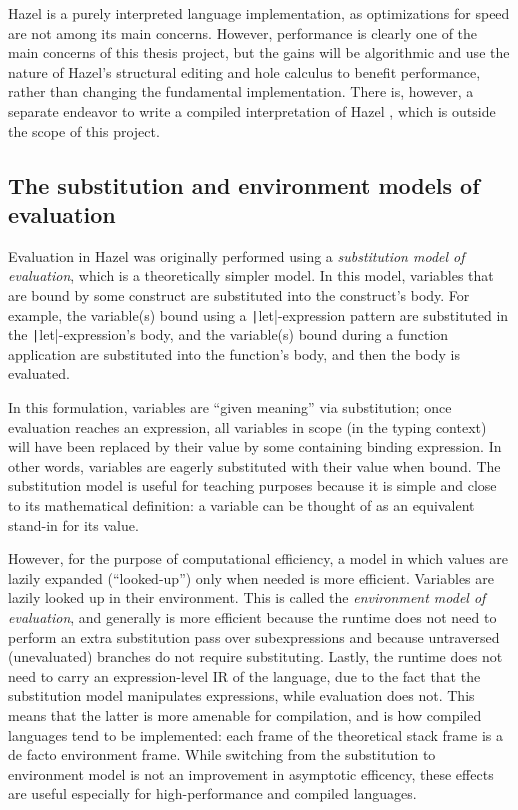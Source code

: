Hazel is a purely interpreted language implementation, as optimizations for speed are not among its main concerns. However, performance is clearly one of the main concerns of this thesis project, but the gains will be algorithmic and use the nature of Hazel's structural editing and hole calculus to benefit performance, rather than changing the fundamental implementation. There is, however, a separate endeavor to write a compiled interpretation of Hazel \cite{hazelc}, which is outside the scope of this project.

\subsection{The substitution and environment models of evaluation}
\label{sec:sub-vs-eval}

Evaluation in Hazel was originally performed using a \textit{substitution model of evaluation}, which is a theoretically simpler model. In this model, variables that are bound by some construct are substituted into the construct's body. For example, the variable(s) bound using a \texttt|let|-expression pattern are substituted in the \texttt|let|-expression's body, and the variable(s) bound during a function application are substituted into the function's body, and then the body is evaluated.

In this formulation, variables are ``given meaning'' via substitution; once evaluation reaches an expression, all variables in scope (in the typing context) will have been replaced by their value by some containing binding expression. In other words, variables are eagerly substituted with their value when bound. The substitution model is useful for teaching purposes because it is simple and close to its mathematical definition: a variable can be thought of as an equivalent stand-in for its value.

However, for the purpose of computational efficiency, a model in which values are lazily expanded (``looked-up'') only when needed is more efficient. Variables are lazily looked up in their environment. This is called the \textit{environment model of evaluation}, and generally is more efficient because the runtime does not need to perform an extra substitution pass over subexpressions and because untraversed (unevaluated) branches do not require substituting. Lastly, the runtime does not need to carry an expression-level IR of the language, due to the fact that the substitution model manipulates expressions, while evaluation does not. This means that the latter is more amenable for compilation, and is how compiled languages tend to be implemented: each frame of the theoretical stack frame is a de facto environment frame. While switching from the substitution to environment model is not an improvement in asymptotic efficency, these effects are useful especially for high-performance and compiled languages.

